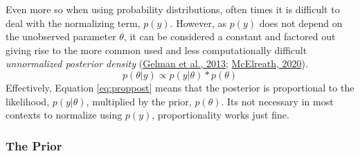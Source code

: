 \documentclass[12pt,twoside]{reedthesis}
\begin{document}
Even more so when using probability distributions, often times it is difficult to deal with the normalizing term, \(p(y)\). However, as \(p(y)\) does not depend on the unobserved parameter \(\theta\), it can be considered a constant and factored out giving rise to the more common used and less computationally difficult \emph{unnormalized posterior density} (\protect\hyperlink{ref-gelmanBayesianDataAnalysis2013}{Gelman et al., 2013}; \protect\hyperlink{ref-mcelreathStatisticalRethinkingBayesian2020}{McElreath, 2020})\emph{.}
\begin{equation}
p(\theta|y) \propto p(y|\theta) * p(\theta)
\label{eq:proppost}
\end{equation}
Effectively, Equation \eqref{eq:proppost} means that the posterior is proportional to the likelihood, \(p(y|\theta)\), multiplied by the prior, \(p(\theta)\). Its not necessary in most contexts to normalize using \(p(y)\), proportionality works just fine.

\hypertarget{the-prior}{%
\subsubsection{The Prior}\label{the-prior}}
\end{document}
